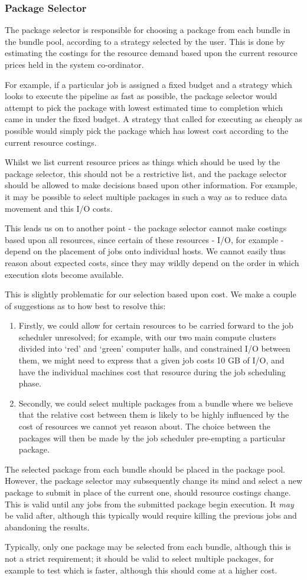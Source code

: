 \documentclass[10pt,a4paper]{article}
\newcommand{\npar}{\par\noindent\space}
\begin{document}
\subsubsection{Package Selector}
\npar The package selector is responsible for choosing a package from each bundle in the bundle pool, according to a strategy selected by the user. This is done by estimating the costings for the resource demand based upon the current resource prices held in the system co-ordinator.
\npar For example, if a particular job is assigned a fixed budget and a strategy which looks to execute the pipeline as fast as possible, the package selector would attempt to pick the package with lowest estimated time to completion which came in under the fixed budget. A strategy that called for executing as cheaply as possible would simply pick the package which has lowest cost according to the current \gls{resource} costings.
\npar Whilst we list current resource prices as things which should be used by the package selector, this should not be a restrictive list, and the package selector should be allowed to make decisions based upon other information. For example, it may be possible to select multiple packages in such a way as to reduce data movement and this I/O costs.
\npar This leads us on to another point - the package selector cannot make costings based upon all resources, since certain of these resources - I/O, for example - depend on the placement of jobs onto individual hosts. We cannot easily thus reason about expected costs, since they may wildly depend on the order in which execution slots become available.
\npar This is slightly problematic for our selection based upon cost. We make a couple of suggestions as to how best to resolve this:
\begin{enumerate}
\item Firstly, we could allow for certain resources to be carried forward to the job scheduler unresolved; for example, with our two main compute clusters divided into `red' and `green' computer halls, and constrained I/O between them, we might need to express that a given job costs 10 GB of I/O, and have the individual machines cost that resource during the job scheduling phase.
\item Secondly, we could select multiple packages from a bundle where we believe that the relative cost between them is likely to be highly influenced by the cost of resources we cannot yet reason about. The choice between the packages will then be made by the job scheduler pre-empting a particular package.
\end{enumerate}
\npar The selected package from each bundle should be placed in the package pool. However, the package selector may subsequently change its mind and select a new package to submit in place of the current one, should resource costings change. This is valid until any jobs from the submitted package begin execution. It \textit{may} be valid after, although this typically would require killing the previous jobs and abandoning the results.
\npar Typically, only one package may be selected from each bundle, although this is not a strict requirement; it should be valid to select multiple packages, for example to test which is faster, although this should come at a higher cost.
\end{document}
